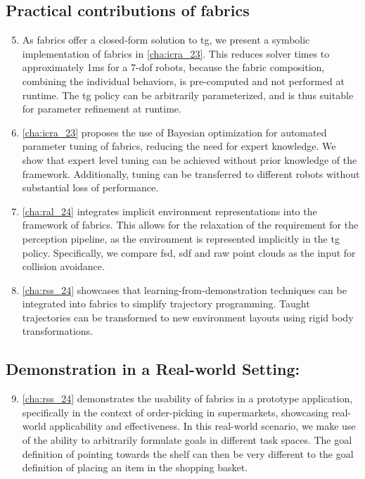\subsection{Practical contributions of \ac{fabrics}}
\begin{enumerate}
  \setcounter{enumi}{4}
  \item As \ac{fabrics} offer a closed-form solution to
    \ac{tg}, we present a symbolic implementation of
    \ac{fabrics} in \cref{cha:icra_23}. This reduces
    solver times to approximately 1ms for a 7-\ac{dof} robots, 
    because the fabric composition, combining
    the individual behaviors, is pre-computed and not
    performed at runtime. The \ac{tg} policy can be
    arbitrarily parameterized, and is thus suitable for
    parameter refinement at runtime.
  \item \cref{cha:icra_23} proposes the use of Bayesian optimization for
    automated parameter tuning of \ac{fabrics},
    reducing the need for expert knowledge. We show that
    expert level tuning can be achieved without prior
    knowledge of the framework. Additionally, tuning can
    be transferred to different robots without substantial
    loss of performance.
  \item \cref{cha:ral_24} integrates implicit environment
    representations into the framework of \ac{fabrics}.
    This allows for the relaxation of the requirement for
    the perception pipeline, as the environment is
    represented implicitly in the \ac{tg} policy.
    Specifically, we compare \ac{fsd}, \ac{sdf} and raw
    point clouds as the input for collision avoidance.
  \item \cref{cha:rss_24} showcases that learning-from-demonstration
    techniques can be integrated into \ac{fabrics} to
    simplify trajectory programming. Taught trajectories
    can be transformed to new environment layouts using 
    rigid body transformations.
\end{enumerate}

\subsection{Demonstration in a Real-world Setting:}
\begin{enumerate}
  \setcounter{enumi}{8}
  \item \cref{cha:rss_24} demonstrates the usability of \ac{fabrics}
      in a prototype application, specifically in the
      context of order-picking in supermarkets, showcasing
      real-world applicability and effectiveness. In this
      real-world scenario, we make use of the ability
      to arbitrarily formulate goals in different task
      spaces. The goal definition of pointing towards the
      shelf can then be very different to the goal
      definition of placing an item in the shopping basket.
\end{enumerate}

